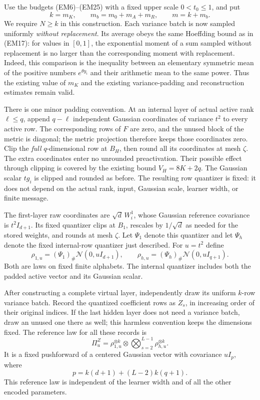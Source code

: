 Use the budgets (EM6)--(EM25) with a fixed upper scale
$0<t_0\le1$, and put
\[
 k=m_K,\qquad m_b=m_0+m_A+m_R,\qquad m=k+m_b.
\]
We require $N\ge k$ in this construction. Each variance batch is now
sampled uniformly \emph{without replacement}. Its average obeys the
same Hoeffding bound as in (EM17): for values in $[0,1]$, the exponential
moment of a sum sampled without replacement is no larger than the
corresponding moment with replacement. Indeed, this comparison is the
inequality between an elementary symmetric mean of the positive numbers
$e^{\theta y_i}$ and their arithmetic mean to the same power.
Thus the existing value of $m_K$ and the existing variance-padding and
reconstruction estimates remain valid.

There is one minor padding convention. At an internal layer of actual
active rank $\ell\le q$, append $q-\ell$ independent Gaussian
coordinates of variance $t^2$ to every active row. The corresponding
rows of $F$ are zero, and the unused block of the metric is diagonal;
the metric projection therefore keeps those coordinates zero. Clip the
\emph{full} $q$-dimensional row at $B_H$, then round all its coordinates
at mesh $\zeta$. The extra coordinates enter no unrounded preactivation.
Their possible effect through clipping is covered by the existing bound
$V_H=8K+2q$. The Gaussian scalar $tg_i$ is clipped and rounded as before.
The resulting row quantizer is fixed: it does not depend on the actual
rank, input, Gaussian scale, learner width, or finite message.

The first-layer raw coordinates are $\sqrt d\,W^1_i$, whose Gaussian
reference covariance is $t^2I_{d+1}$. Its fixed quantizer clips at $B_1$,
rescales by $1/\sqrt d$ as needed for the stored weights, and rounds at
mesh $\zeta$. Let $\Psi_1$ denote this quantizer and let $\Psi_h$ denote
the fixed internal-row quantizer just described. For $u=t^2$ define
\[
 \rho_{1,u}=(\Psi_1)_\#\mathcal N(0,uI_{d+1}),\qquad
 \rho_{h,u}=(\Psi_h)_\#\mathcal N(0,uI_{q+1}).
\]
Both are laws on fixed finite alphabets. The internal quantizer includes
both the padded active vector and its Gaussian scalar.

After constructing a complete virtual layer, independently draw its
uniform $k$-row variance batch. Record the quantized coefficient rows as
$Z_s$, in increasing order of their original indices. If the last hidden
layer does not need a variance batch, draw an unused one there as well;
this harmless convention keeps the dimensions fixed. The reference law
for all these records is
\[
 \Pi_u^Z=\rho_{1,u}^{\otimes k}
          \otimes\bigotimes_{s=2}^{L-1}\rho_{h,u}^{\otimes k}.
\]
It is a fixed pushforward of a centered Gaussian vector with covariance
$uI_p$, where
\begin{equation}\label{eq:weighted-gaussian-dimension}
 p=k(d+1)+(L-2)k(q+1).
\end{equation}
This reference law is independent of the learner width and of all the
other encoded parameters.

